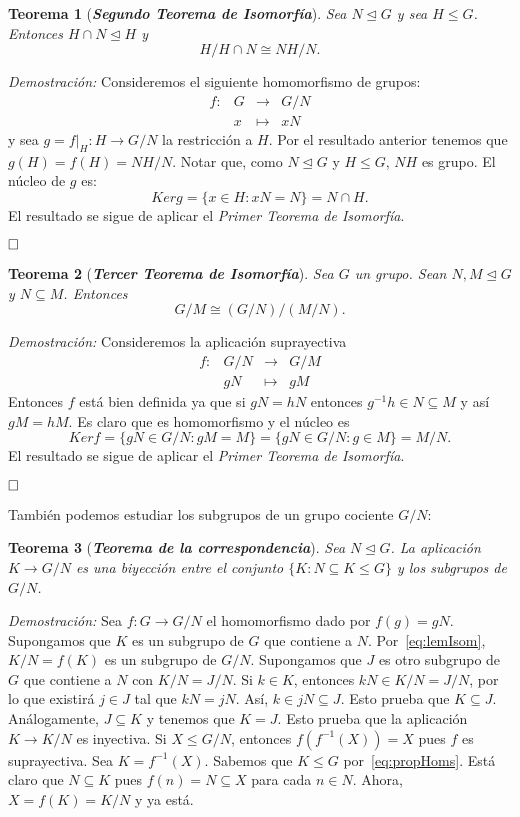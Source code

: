 \documentclass[12pt]{article}
\newtheorem{theorem}{Teorema}[section]
\begin{document}
\begin{theorem}[\textbf{\textit{Segundo Teorema de Isomorfía}}]
Sea $N \unlhd G$ y sea $H \leq G$. Entonces $H \cap N \unlhd H$ y $$H/H\cap N \cong NH/N.$$

\end{theorem}
\emph{Demostración: }Consideremos el siguiente homomorfismo de grupos: $$\begin{array}{rccl}
f\colon &G&\longrightarrow &G/N \\
&x& \longmapsto &xN
\end{array}
$$
y sea $g = \left.f \right|_H \colon H \longrightarrow G/N$ la restricción a $H$. Por el resultado anterior tenemos que $g(H) = f(H) = NH/N$. Notar que, como $N \unlhd G$ y $H \leq G$, $NH$ es grupo. El núcleo de $g$ es:
$$Ker g = \lbrace x \in H :xN = N \rbrace = N \cap H.$$ El resultado se sigue de aplicar el \textit{Primer Teorema de Isomorfía}.

$\hfill \square$

\begin{theorem}[\textbf{\textit{Tercer Teorema de Isomorfía}}]
Sea $G$ un grupo. Sean $N,M \unlhd G$ y $N \subseteq M$. Entonces $$G/M \cong (G/N)/(M/N).$$
\end{theorem}
\emph{Demostración: }Consideremos la aplicación suprayectiva $$\begin{array}{rccl}
f \colon &G/N&\longrightarrow &G/M\\
&gN& \longmapsto &gM
\end{array}
$$
Entonces $f$ está bien definida ya que si $gN = hN$ entonces $g^{-1}h \in N \subseteq M$ y así $gM =hM$. Es claro que es homomorfismo y el núcleo es $$Ker f = \lbrace gN \in G/N : gM = M \rbrace = \lbrace gN \in G/N : g \in M \rbrace = M/N.$$
El resultado se sigue de aplicar el \textit{Primer Teorema de Isomorfía}.

$\hfill \square$

También podemos estudiar los subgrupos de un grupo cociente $G/N$:

\begin{theorem}[\textbf{\textit{Teorema de la correspondencia}}]
Sea $N \unlhd G$. La aplicación $K \longrightarrow G/N$ es una biyección entre el conjunto $\lbrace K: N \subseteq K \leq G \rbrace$ y los subgrupos de $G/N$.
\end{theorem}
\emph{Demostración: }Sea $f \colon G \longrightarrow G/N$ el homomorfismo dado por $f(g) = gN$. Supongamos que $K$ es un subgrupo de $G$ que contiene a $N$. Por~\ref{eq:lemIsom}, $K/N = f(K)$ es un subgrupo de $G/N$. Supongamos que $J$ es otro subgrupo de $G$ que contiene a $N$ con $K/N = J/N$. Si $k \in K$, entonces $kN \in K/N = J/N$, por lo que existirá $j \in J$ tal que $kN = jN$. Así, $k \in jN \subseteq J$. Esto prueba que $K \subseteq J$. Análogamente, $J \subseteq K$ y tenemos que $K=J$. Esto prueba que la aplicación $K \longrightarrow K/N$ es inyectiva. Si $X \leq G/N$, entonces $f(f^{-1}(X)) = X$ pues $f$ es suprayectiva. Sea $K = f^{-1}(X)$. Sabemos que $K \leq G$ por~\ref{eq:propHoms}. Está claro que $N \subseteq K$ pues $f(n) = N \subseteq X$ para cada $n \in N$. Ahora, $X=f(K) = K/N$ y ya está.
\end{document}
